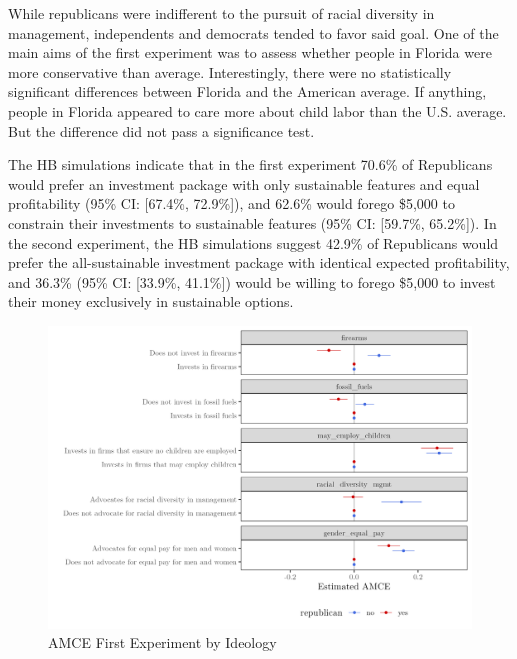 \documentclass[
  12pt,
]{article}
\begin{document}
While republicans were indifferent to the pursuit of racial diversity in management, independents and democrats tended to favor said goal. One of the main aims of the first experiment was to assess whether people in Florida were more conservative than average. Interestingly, there were no statistically significant differences between Florida and the American average. If anything, people in Florida appeared to care more about child labor than the U.S. average. But the difference did not pass a significance test.

The HB simulations indicate that in the first experiment 70.6\% of Republicans would prefer an investment package with only sustainable features and equal profitability (95\% CI: {[}67.4\%, 72.9\%{]}), and 62.6\% would forego \$5,000 to constrain their investments to sustainable features (95\% CI: {[}59.7\%, 65.2\%{]}). In the second experiment, the HB simulations suggest 42.9\% of Republicans would prefer the all-sustainable investment package with identical expected profitability, and 36.3\% (95\% CI: {[}33.9\%, 41.1\%{]}) would be willing to forego \$5,000 to invest their money exclusively in sustainable options.

\begin{figure}

{\centering \includegraphics{amce_byr_shorter} 

}

\caption{AMCE First Experiment by Ideology}\label{fig:amce1byr}
\end{figure}
\end{document}
